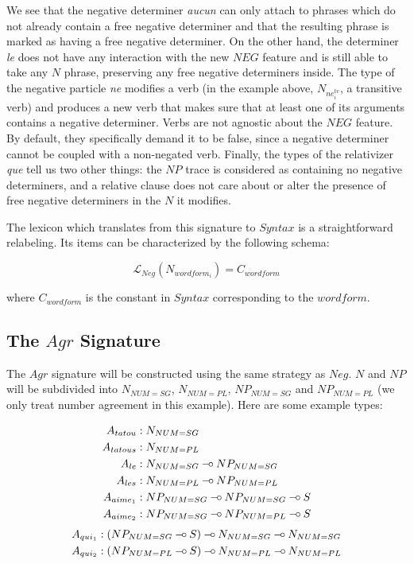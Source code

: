 \documentclass{llncs}
\def\limp {\mathbin{{-}\mkern-3.5mu{\circ}}}
\begin{document}
\vspace{-3ex}

We see that the negative determiner \emph{aucun} can only attach to phrases
which do not already contain a free negative determiner and that the resulting
phrase is marked as having a free negative determiner. On the other hand, the
determiner \emph{le} does not have any interaction with the new $NEG$ feature
and is still able to take any $N$ phrase, preserving any free negative
determiners inside. The type of the negative particle \emph{ne} modifies a
verb (in the example above, $N_{ne^{tv}_i}$, a transitive verb) and produces a
new verb that makes sure that at least one of its arguments contains a
negative determiner. Verbs are not agnostic about the $NEG$ feature. By
default, they specifically demand it to be false, since a negative determiner
cannot be coupled with a non-negated verb. Finally, the types of the
relativizer \emph{que} tell us two other things: the $NP$ trace is considered
as containing no negative determiners, and a relative clause does not care
about or alter the presence of free negative determiners in the $N$ it
modifies.

The lexicon which translates from this signature to $Syntax$ is a
straightforward relabeling. Its items can be characterized by the following
schema:

$$
\mathcal{L}_{Neg}(N_{wordform_{i}}) = C_{wordform}
$$

where $C_{wordform}$ is the constant in $Syntax$ corresponding to the
$wordform$.

\subsection{The $Agr$ Signature}

The $Agr$ signature will be constructed using the same strategy as $Neg$. $N$
and $NP$ will be subdivided into $N_{NUM{=}SG}$, $N_{NUM{=}PL}$,
$NP_{NUM{=}SG}$ and $NP_{NUM{=}PL}$ (we only treat number agreement in this
example). Here are some example types:

\begin{align*}
A_{tatou} &: N_{NUM{=}SG} \\
A_{tatous} &: N_{NUM{=}PL} \\
A_{le} &: N_{NUM{=}SG} \limp NP_{NUM{=}SG} \\
A_{les} &: N_{NUM{=}PL} \limp NP_{NUM{=}PL} \\
A_{aime_1} &: NP_{NUM{=}SG} \limp NP_{NUM{=}SG} \limp S \\
A_{aime_2} &: NP_{NUM{=}SG} \limp NP_{NUM{=}PL} \limp S \\
\end{align*} %
\begin{align*}
A_{qui_1} &: (NP_{NUM{=}SG} \limp S) \limp N_{NUM{=}SG} \limp N_{NUM{=}SG} \\
A_{qui_2} &: (NP_{NUM{=}PL} \limp S) \limp N_{NUM{=}PL} \limp N_{NUM{=}PL} \\
\end{align*}
\end{document}
